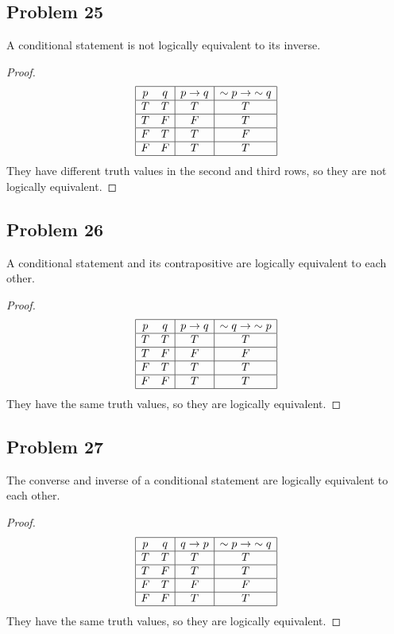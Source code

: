 \documentclass[14pt]{extarticle}
\begin{document}
\subsection{Problem 25}
A conditional statement is not logically equivalent to its inverse.

\begin{proof}
$$
\begin{array}{|cc|c|c|}
\hline
p & q & p \to q & {\sim p} \to {\sim q} \\
\hline
T & T & T & T \\
\hline
T & F & F & T \\
\hline
F & T & T & F \\
\hline
F & F & T & T \\
\hline
\end{array}
$$
They have different truth values in the second and third rows, so they are not logically equivalent.
\end{proof}

\subsection{Problem 26}
A conditional statement and its contrapositive are logically equivalent to each other.

\begin{proof}
$$
\begin{array}{|cc|c|c|}
\hline
p & q & p \to q & {\sim q} \to {\sim p} \\
\hline
T & T & T & T \\
\hline
T & F & F & F \\
\hline
F & T & T & T \\
\hline
F & F & T & T \\
\hline
\end{array}
$$
They have the same truth values, so they are logically equivalent.
\end{proof}

\subsection{Problem 27}
The converse and inverse of a conditional statement are logically equivalent to each other.

\begin{proof}
$$
\begin{array}{|cc|c|c|}
\hline
p & q & q \to p & {\sim p} \to {\sim q} \\
\hline
T & T & T & T \\
\hline
T & F & T & T \\
\hline
F & T & F & F \\
\hline
F & F & T & T \\
\hline
\end{array}
$$
They have the same truth values, so they are logically equivalent.
\end{proof}
\end{document}
